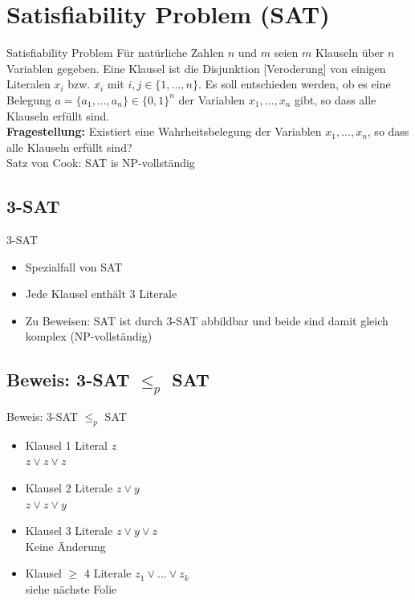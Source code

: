 \documentclass[12pt,donthandout,notes=dontshow,xcolor=table]{beamer}
\begin{document}
\section{Satisfiability Problem (SAT)}
\begin{frame}{Satisfiability Problem}
Für natürliche Zahlen \(n\) und \(m\) seien \(m\) Klauseln über \(n\) Variablen gegeben.
Eine Klausel ist die Disjunktion [Veroderung] von einigen Literalen \(x_i\) bzw. \(\overline{x_i}\) mit \(i,j \in \{1,...,n\}\). Es soll entschieden werden, ob es eine Belegung \(a = \{a_1,...,a_n\} \in \{0,1\}^n\) der Variablen \(x_1,...,x_n\) gibt, so dass alle Klauseln erfüllt sind.\\
\pause
\textbf{Fragestellung:} Existiert eine Wahrheitsbelegung der Variablen \(x_1,...,x_n\), so dass alle Klauseln erfüllt sind?\\
\pause
\textrightarrow Satz von Cook: SAT is NP-vollständig
\end{frame}

\subsection{3-SAT}
\begin{frame}{3-SAT}
\begin{itemize}
\item Spezialfall von SAT
\item Jede Klausel enthält 3 Literale
\item Zu Beweisen: SAT ist durch 3-SAT abbildbar und beide sind damit gleich komplex (NP-vollständig)
\end{itemize}
\end{frame}

\subsection{Beweis: 3-SAT $\leq_p$ SAT}
\begin{frame}{Beweis: 3-SAT \(\leq_p\) SAT}
\begin{itemize}
\item Klausel 1 Literal  \(z\) \\ \textrightarrow \(z \vee z \vee z\)
\item Klausel 2 Literale \(z \vee y\) \\ \textrightarrow \(z \vee z \vee y\)
\item Klausel 3 Literale \(z \vee y \vee z\) \\ \textrightarrow Keine Änderung
\item Klausel \(\ge\) 4 Literale \(z_1 \vee ... \vee z_k\) \\ \textrightarrow siehe nächste Folie
\end{itemize}
\end{frame}
\end{document}
